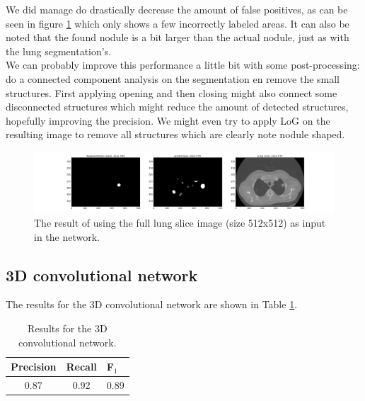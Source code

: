\documentclass{article}
\begin{document}
	We did manage do drastically decrease the amount of false positives, as can be seen in figure \ref{fig:nodules} which only shows a few incorrectly labeled areas. It can also be noted that the found nodule is a bit larger than the actual nodule, just as with the lung segmentation's.\\
	
	We can probably improve this performance a little bit with some post-processing: do a connected component analysis on the segmentation en remove the small structures. First applying opening and then closing might also connect some disconnected structures which might reduce the amount of detected structures, hopefully improving the precision. We might even try to apply LoG on the resulting image to remove all structures which are clearly note nodule shaped.
	
	\begin{figure}
		\centering
		\includegraphics[width=\linewidth]{nodule_vs_lungs.png}
		\caption{The result of using the full lung slice image (size 512x512) as input in the network.}
		\label{fig:nodules}
	\end{figure}
	
	
	\subsection{3D convolutional network}
	The results for the 3D convolutional network are shown in Table \ref{tbl:results_3d}.
	
	\begin{table}[h]
		\caption{\small{Results for the 3D convolutional network.}}
		\label{tbl:results_3d}
		\vspace{0.2cm}
		\centering
		\begin{tabular}{c | c | l}
			Precision & Recall & F$_1$\\
			\hline \hline
			0.87 & 0.92 & 0.89
		\end{tabular}
	\end{table}
	
	
	
\end{document}
